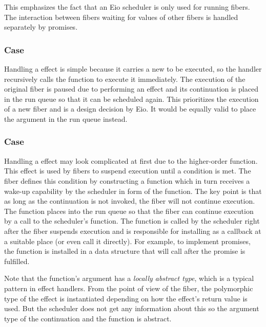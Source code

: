 This emphasizes the fact that an Eio scheduler is only used for running fibers.
The interaction between fibers waiting for values of other fibers is handled separately by promises.

\subsubsection*{\efork{} Case}
Handling a \efork{} effect is simple because it carries a new  to be executed, so the handler recursively calls the  function to execute it immediately.
The execution of the original fiber is paused due to performing an effect and its continuation  is placed in the run queue so that it can be scheduled again.
This prioritizes the execution of a new fiber and is a design decision by Eio.
It would be equally valid to place the  argument in the run queue instead.

\subsubsection*{\esuspend{} Case}
Handling a \esuspend{} effect may look complicated at first due to the higher-order  function.
This effect is used by fibers to suspend execution until a condition is met.
The fiber defines this condition by constructing a  function which in turn receives a wake-up capability by the scheduler in form of the  function.
The key point is that as long as the continuation  is not invoked, the fiber will not continue execution.
The  function places  into the run queue so that the fiber can continue execution by a call to the scheduler's  function.
The  function is called by the scheduler right after the fiber suspends execution and is responsible for installing  as a callback at a suitable place (or even call it directly).
For example, to implement promises, the  function is installed in a data structure that will call  after the promise is fulfilled.

Note that the  function's argument  has a \emph{locally abstract type}, which is a typical pattern in effect handlers.
From the point of view of the fiber, the polymorphic type  of the \esuspend{} effect is instantiated depending on how the effect's return value is used.
But the scheduler does not get any information about this so the argument type of the continuation  and the  function is abstract.

